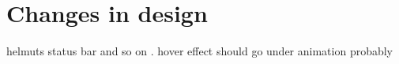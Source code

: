 %
%
% 
% 
% 


\chapter{Changes in design}

\label{chap:design}

helmuts status bar and so on . hover effect should go under animation probably